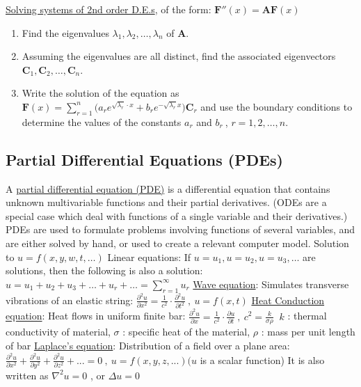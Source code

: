 \documentclass[12pt]{article}
\begin{document}
\begin{flushleft}
	\textbullet \quad \uline{Solving systems of 2nd order D.E.s}, of the form: $\displaystyle \textbf{F}''(x) = \textbf{A} \textbf{F}(x)$  
	\begin{enumerate}
	\item Find the eigenvalues $\lambda_1, \lambda_2, \ldots, \lambda_n$ of $\textbf{A}$. 
	\item Assuming the eigenvalues are all distinct, find the associated eigenvectors $\displaystyle \textbf{C}_1, \textbf{C}_2, \ldots, \textbf{C}_n$. 
	\item Write the solution of the equation as $\displaystyle \textbf{F}(x) = \sum \limits_{r=1}^n \big( a_re^{\sqrt{\lambda_r} \cdot x} + b_r e^{-\sqrt{\lambda_r}x} \big) \textbf{C}_r $ \linebreak 
	and use the boundary conditions to determine the values of the constants $a_r$ and $b_r\ $, $r=1,2,\ldots, n$. 
	\end{enumerate} 
	
	\subsection{Partial Differential Equations (PDEs)} 
	
	\textbullet \quad A \uline{partial differential equation (PDE)} is a differential equation that contains unknown multivariable functions and their partial derivatives. (ODEs are a special case which deal with functions of a single variable and their derivatives.) PDEs are used to formulate problems involving functions of several variables, and are either solved by hand, or used to create a relevant computer model. \linebreak 
	\textbullet \quad Solution to $u=f(x,y,w,t,\ldots)$ \linebreak 
	\textbullet \quad Linear equations: If $u=u_1, u=u_2, u=u_3, \ldots $ are solutions, then the following is also a solution: $\displaystyle u=u_1 + u_2 +u_3 + \ldots + u_r + \ldots = \sum \limits_{r=1}^{\infty} u_r$ \linebreak 
	\textbullet \quad \uline{Wave equation}: Simulates transverse vibrations of an elastic string: $\displaystyle \frac{\partial^2 u}{\partial x^2} = \frac{1}{c^2} \cdot \frac{\partial^2 u}{\partial t^2} \ , \ u = f(x,t)$ \linebreak 
	\textbullet \quad \uline{Heat Conduction equation}: Heat flows in uniform finite bar: $\displaystyle \frac{\partial^2 u}{\partial x} = \frac{1}{c^2} \cdot \frac{\partial u}{\partial t} \ , \ c^2 = \frac{k}{\sigma \rho} \ $ \linebreak 
	$k$  :  thermal conductivity of material, $\sigma$  :  specific heat of the material, $\rho$  :  mass per unit length of bar \linebreak 
	\textbullet \quad \uline{Laplace's equation}: Distribution of a field over a plane area: $\displaystyle \frac{\partial^2 u}{\partial x^2} + \frac{\partial^2 u}{\partial y^2} + \frac{\partial^2 u}{\partial z^2} + ... = 0 \ , \ u = f(x,y,z,...) (u$ is a scalar function) \linebreak 
	It is also written as $\displaystyle \nabla^2 u = 0$ , or $\Delta u = 0$  
	

\end{flushleft}
\end{document}
